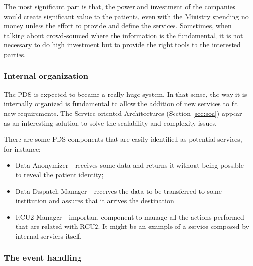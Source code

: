 The most significant part is that, the power and investment of the companies would create significant value to the patients, even with the Ministry spending no money unless the effort to provide and define the services. Sometimes, when talking about crowd-sourced where the information is the fundamental, it is not necessary to do high investment but to provide the right tools to the interested parties.


\subsubsection{Internal organization}

The PDS is expected to became a really huge system. In that sense, the way it is internally organized is fundamental to allow the addition of new services to fit new requirements. The Service-oriented Architectures (Section \ref{sec:soa}) appear as an interesting solution to solve the scalability and complexity issues.

There are some PDS components that are easily identified as potential services, for instance:
\begin{itemize}
\item Data Anonymizer - receives some data and returns it without being possible to reveal the patient identity;
\item Data Dispatch Manager - receives the data to be transferred to some institution and assures that it arrives the destination;
\item RCU2 Manager - important component to manage all the actions performed that are related with RCU2. It might be an example of a service composed by internal services itself.
\end{itemize}


\subsubsection{The event handling}

